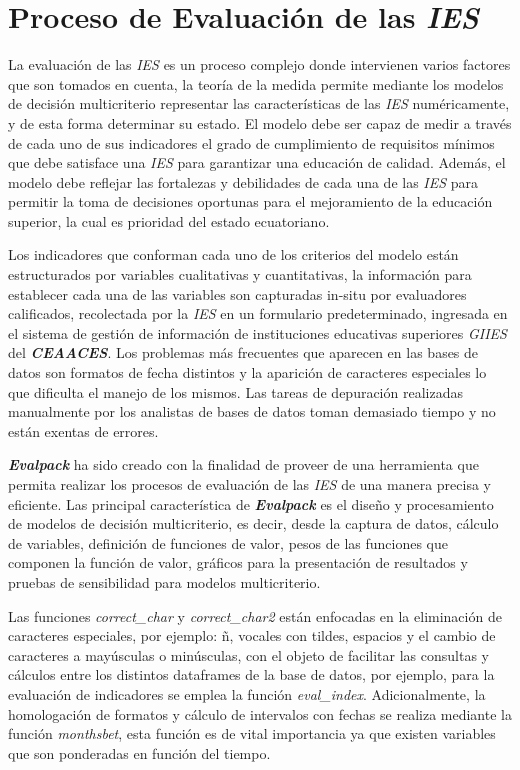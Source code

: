 \section{Proceso de Evaluación de las \textit{\textbf{IES}} }
La evaluación de las {\it IES} es un proceso complejo donde intervienen varios factores que son tomados en cuenta, la teoría de la medida permite mediante los modelos de decisión multicriterio representar las características de las {\it IES} numéricamente\citep{2}, y de esta forma determinar su estado. El modelo debe ser capaz de medir a través de cada uno de sus indicadores el grado de cumplimiento de requisitos mínimos que debe satisface una {\it IES} para garantizar una educación de calidad. Además, el modelo debe reflejar las fortalezas y debilidades de cada una de las {\it IES} para permitir la toma de decisiones oportunas para el mejoramiento de la educación superior, la cual es prioridad del estado ecuatoriano.

Los indicadores que conforman cada uno de los criterios del modelo están estructurados por variables cualitativas y cuantitativas, la información para establecer cada una de las variables son capturadas in-situ por evaluadores calificados, recolectada por la {\it IES} en un formulario predeterminado, ingresada en el sistema de gestión de información de instituciones educativas superiores {\it GIIES} del \textit{\textbf{CEAACES}}. Los problemas más frecuentes que aparecen en las bases de datos son formatos de fecha distintos y la aparición de caracteres especiales lo que dificulta el manejo de los mismos. Las tareas de depuración realizadas manualmente por los analistas de bases de datos toman demasiado tiempo y no están exentas de errores.

\textit{\textbf{Evalpack}} ha sido creado con la finalidad de proveer de una herramienta que permita realizar los procesos de evaluación de las {\it IES} de una manera precisa y eficiente. Las principal característica de \textit{\textbf{Evalpack}} es el diseño y procesamiento de modelos de decisión multicriterio, es decir, desde la captura de datos, cálculo de variables, definición de funciones de valor, pesos de las funciones que componen la función de valor, gráficos para la presentación de resultados y pruebas de sensibilidad para modelos multicriterio.
       
Las funciones {\it correct\_char} y {\it correct\_char2} están enfocadas en la eliminación de caracteres especiales, por ejemplo: ñ, vocales con tildes, espacios y el cambio de caracteres a mayúsculas o minúsculas, con el objeto de facilitar las consultas y cálculos entre los distintos dataframes de la base de datos, por ejemplo, para la  evaluación de indicadores se emplea la función {\it eval\_index}. Adicionalmente, la homologación de formatos y cálculo de intervalos con fechas se realiza mediante la función {\it monthsbet}, esta función es de vital importancia ya que existen variables que son ponderadas en función del tiempo.\\

